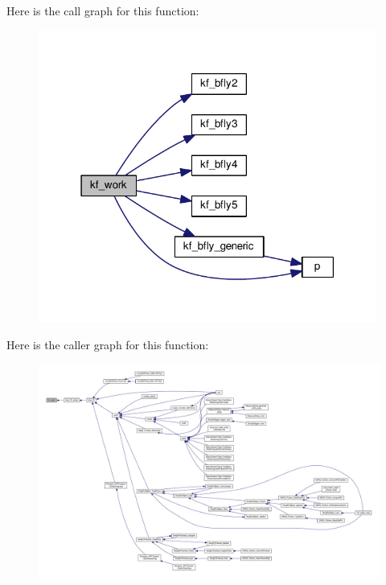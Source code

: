 Here is the call graph for this function\+:
\nopagebreak
\begin{figure}[H]
\begin{center}
\leavevmode
\includegraphics[width=315pt]{d3/d69/kiss__fft_8c_a96e4f47862a2df7183ae9e8caaf7a866_cgraph}
\end{center}
\end{figure}




Here is the caller graph for this function\+:
\nopagebreak
\begin{figure}[H]
\begin{center}
\leavevmode
\includegraphics[width=350pt]{d3/d69/kiss__fft_8c_a96e4f47862a2df7183ae9e8caaf7a866_icgraph}
\end{center}
\end{figure}


